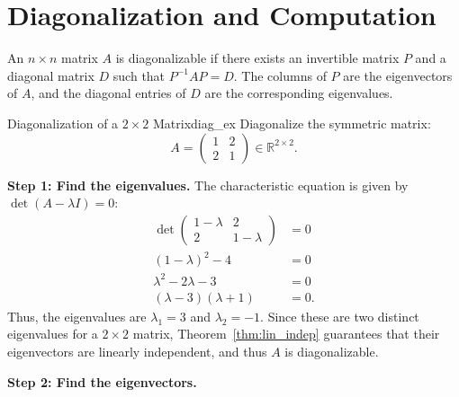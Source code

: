 \section{Diagonalization and Computation}
An $n \times n$ matrix $A$ is diagonalizable if there exists an invertible matrix $P$ and a diagonal matrix $D$ such that $P^{-1} A P = D$. The columns of $P$ are the eigenvectors of $A$, and the diagonal entries of $D$ are the corresponding eigenvalues.

\begin{example}{Diagonalization of a $2 \times 2$ Matrix}{diag_ex}
    Diagonalize the symmetric matrix:
    \begin{equation*}
        A = \begin{pmatrix} 1 & 2 \\ 2 & 1 \end{pmatrix} \in \mathbb{R}^{2 \times 2}.
    \end{equation*}
    
    \textbf{Step 1: Find the eigenvalues.} The characteristic equation is given by $\det(A - \lambda I) = 0$:
    \begin{align*}
        \det\begin{pmatrix} 1-\lambda & 2 \\ 2 & 1-\lambda \end{pmatrix} &= 0 \\
        (1-\lambda)^2 - 4 &= 0 \\
        \lambda^2 - 2\lambda - 3 &= 0 \\
        (\lambda - 3)(\lambda + 1) &= 0.
    \end{align*}
    Thus, the eigenvalues are $\lambda_1 = 3$ and $\lambda_2 = -1$. Since these are two distinct eigenvalues for a $2 \times 2$ matrix, Theorem~\ref{thm:lin_indep} guarantees that their eigenvectors are linearly independent, and thus $A$ is diagonalizable.
    
    \textbf{Step 2: Find the eigenvectors.}
    

\end{example}
